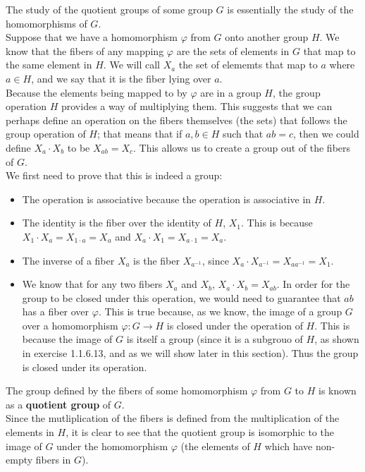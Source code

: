 \documentclass[12pt]{article}
\begin{document}
    The study of the quotient groups of some group $G$
    is essentially the study of the homomorphisms of $G$. \\
    Suppose that we have a homomorphism $\varphi$
    from $G$ onto another group $H$.
    We know that the fibers of any mapping $\varphi$
    are the sets of elements in $G$ that map to the same element
    in $H$.
    We will call $X_a$ the set of elememts that map to $a$
    where $a \in H$,
    and we say that it is the fiber lying over $a$. \\
    Because the elements being mapped to by $\varphi$
    are in a group $H$,
    the group operation $H$ provides a way of multiplying them.
    This suggests that we can perhaps define an operation
    on the fibers themselves (the sets) that follows
    the group operation of $H$;
    that means that if $a, b \in H$ such that $ab = c$,
    then we could define $X_a \cdot X_b$ to be $X_{ab} = X_{c}$.
    This allows us to create a group out of the fibers of $G$. \\
    We first need to prove that this is indeed a group:
    \begin{itemize}[label=$\diamond$]
        \item 
            The operation is associative because
            the operation is associative in $H$.
        \item
            The identity is the fiber over the identity of $H$,
            $X_1$.
            This is because $X_1 \cdot X_a = X_{1 \cdot a} = X_{a}$
            and $X_a \cdot X_1 = X_{a \cdot 1} = X_{a}$.
        \item
            The inverse of a fiber $X_a$ is the fiber $X_{a^{-1}}$,
            since $X_a \cdot X_{a^{-1}} = X_{aa^{-1}} = X_1$.
        \item
            We know that for any two fibers $X_a$ and $X_b$,
            $X_a \cdot X_b = X_{ab}$.
            In order for the group to be closed under this operation,
            we would need to guarantee that $ab$ has a fiber
            over $\varphi$.
            This is true because, as we know,
            the image of a group $G$ over a homomorphism
            $\varphi: G \to H$
            is closed under the operation of $H$.
            This is because the image of $G$ is itself a group
            (since it is a subgrouo of $H$, 
            as shown in exercise 1.1.6.13,
            and as we will show later in this section).
            Thus the group is closed under its operation.
    \end{itemize}
    The group defined by the fibers of some homomorphism $\varphi$
    from $G$ to $H$
    is known as a \textbf{quotient group} of $G$. \\
    Since the mutliplication of the fibers is defined
    from the multiplication of the elements in $H$,
    it is clear to see that the quotient group is isomorphic
    to the image of $G$ under the homomorphism $\varphi$
    (the elements of $H$ which have non-empty fibers in $G$). \\
\end{document}
